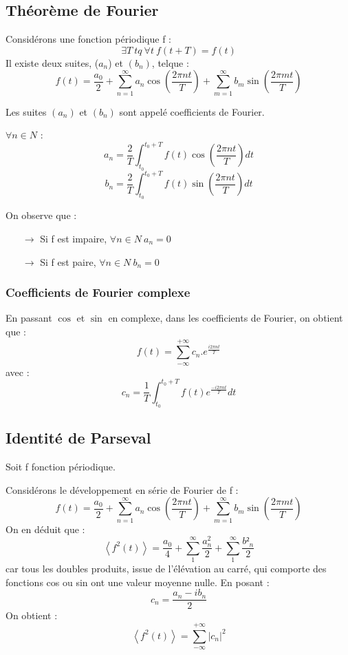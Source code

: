 \subsection{Théorème de Fourier}
\begin{enon}
Considérons une fonction périodique f : 
$$\exists T~ tq~ \forall t~ f(t+T) = f(t)$$
Il existe deux suites, ($a_n$) et $(b_n)$, telque : 
$$f(t) = \dfrac{a_0}{2} + \sum_{n=1}^{\infty} a_n\cos\left(\dfrac{2\pi n t}{T}\right) + \sum_{m=1}^{\infty} b_m\sin\left(\dfrac{2\pi m t}{T}\right)$$
\end{enon}
Les suites $(a_n)$ et $(b_n)$ sont appelé coefficients de Fourier.
\begin{enon}
$\forall n \in N$ : 
$$a_n = \dfrac{2}{T}\int_{t_0}^{t_0+T} f(t)\cos\left(\dfrac{2\pi nt}{T}\right)dt$$
$$b_n = \dfrac{2}{T}\int_{t_0}^{t_0+T} f(t)\sin\left(\dfrac{2\pi nt}{T}\right)dt$$
\end{enon}
\begin{prop}
On observe que : 
\begin{itemize}
 \item[$\rightarrow$] Si f est impaire, $\forall n \in N~ a_n=0$
 \item[$\rightarrow$] Si f est paire, $\forall n \in N~ b_n=0$
\end{itemize}
\end{prop}
\subsubsection{Coefficients de Fourier complexe}
\begin{prop}
En passant $\cos$ et $\sin$ en complexe, dans les coefficients de Fourier, on obtient que : 
$$f(t) = \sum_{-\infty}^{+\infty}c_n.e^{\frac{i2\pi nt}{T}}$$
avec : 
$$c_n = \dfrac{1}{T}\int_{t_0}^{t_0+T} f(t)e^{\frac{-i2\pi nt}{T}}dt$$
\end{prop}
\subsection{Identité de Parseval}
Soit f fonction périodique.\\
\begin{de}
Considérons le développement en série de Fourier de f : 
$$f(t) = \dfrac{a_0}{2} + \sum_{n=1}^{\infty} a_n\cos\left(\dfrac{2\pi n t}{T}\right) + \sum_{m=1}^{\infty} b_m\sin\left(\dfrac{2\pi m t}{T}\right)$$
On en déduit que : 
$$\left\langle f^2(t)\right\rangle = \dfrac{a_0}{4} + \sum_1^{\infty} \dfrac{a^2_n}{2} + \sum_1^{\infty} \dfrac{b²_n}{2}$$
car tous les doubles produits, issue de l'élévation au carré, qui comporte des fonctions cos ou sin ont une valeur moyenne nulle.
En posant :
$$c_n = \dfrac{a_n - ib_n}{2}$$
On obtient : 
$$\left\langle f^2(t)\right\rangle = \sum_{-\infty}^{+\infty} |c_n|^2$$
 
\end{de}

